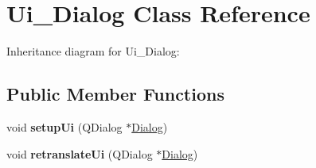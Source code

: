 \hypertarget{classUi__Dialog}{}\section{Ui\+\_\+\+Dialog Class Reference}
\label{classUi__Dialog}


Inheritance diagram for Ui\+\_\+\+Dialog\+:
\subsection*{Public Member Functions}
\begin{DoxyCompactItemize}
\item 
void {\bfseries setup\+Ui} (Q\+Dialog $\ast$\hyperlink{classDialog}{Dialog})\hypertarget{classUi__Dialog_a4f6a478c3ecdafabffb17b39cb26444a}{}\label{classUi__Dialog_a4f6a478c3ecdafabffb17b39cb26444a}

\item 
void {\bfseries retranslate\+Ui} (Q\+Dialog $\ast$\hyperlink{classDialog}{Dialog})\hypertarget{classUi__Dialog_afa0ccb6f716ca6178260522a193c250e}{}\label{classUi__Dialog_afa0ccb6f716ca6178260522a193c250e}

\end{DoxyCompactItemize}
